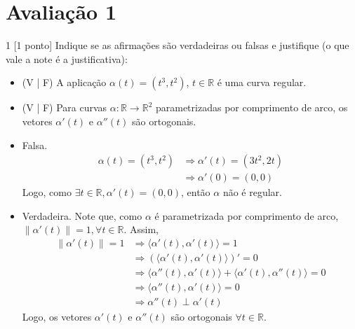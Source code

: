 \documentclass[../main.tex]{subfiles}
\begin{document}
	
	\section{Avaliação 1}
		\begin{exercicio}{1}
			[1 ponto] Indique se as afirmações são verdadeiras ou falsas e justifique (o que vale a note é a justificativa):
			\begin{itemize}
				\item (V | F) A aplicação $\alpha(t)=(t^3,t^2)$, $t \in \mathbb{R}$ é uma curva regular.
				\item (V | F) Para curvas $\alpha \colon \mathbb{R}\to \mathbb{R}^2$ parametrizadas por comprimento de arco, os vetores $\alpha'(t)$ e $\alpha''(t)$ são ortogonais.
			\end{itemize}
		\end{exercicio}
		\begin{solucao}
			\begin{itemize}
				\item Falsa.
				\begin{align*}
					\alpha(t)=(t^3,t^2)
					&\Rightarrow \alpha'(t)=(3t^2,2t)\\
					&\Rightarrow \alpha'(0)=(0,0)
				\end{align*}
				Logo, como $\exists t\in \mathbb{R}, \alpha'(t)=(0,0)$, então $\alpha$ não é regular.
				\item Verdadeira.
				Note que, como $\alpha$ é parametrizada por comprimento de arco, $\|\alpha'(t)\|=1, \forall t \in \mathbb{R}$.
				Assim,
				\begin{align*}
					\|\alpha'(t)\|=1
					&\Rightarrow \langle \alpha'(t), \alpha'(t) \rangle =1\\
					&\Rightarrow (\langle \alpha'(t), \alpha'(t) \rangle)'=0\\
					&\Rightarrow \langle \alpha''(t), \alpha'(t) \rangle + \langle \alpha'(t), \alpha''(t) \rangle = 0\\
					&\Rightarrow \langle \alpha''(t), \alpha'(t) \rangle = 0\\
					&\Rightarrow \alpha''(t) \perp \alpha'(t)
				\end{align*}
				Logo, os vetores $\alpha'(t)$ e $\alpha''(t)$ são ortogonais $\forall t \in \mathbb{R}$.
			\end{itemize}
		\end{solucao}
		
\end{document}
